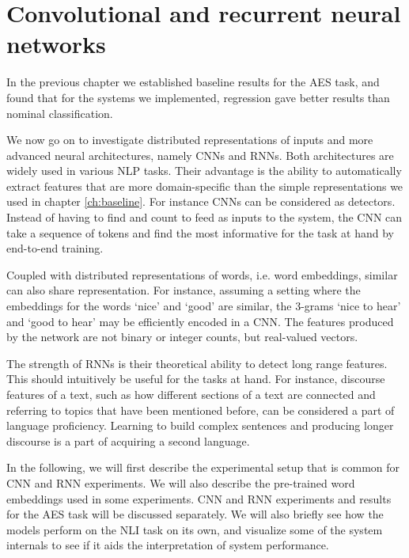 \chapter{Convolutional and recurrent neural networks}
\label{ch:sequencemodels}

In the previous chapter we established baseline results for the \ac{AES} task,
and found that for the systems we implemented, regression gave better results
than nominal classification.

We now go on to investigate distributed representations of inputs and more
advanced neural architectures, namely \acp{CNN} and \acp{RNN}. Both
architectures are widely used in various \ac{NLP} tasks. Their advantage is
the ability to automatically extract features that are more domain-specific
than the simple representations we used in chapter \ref{ch:baseline}. For
instance \acp{CNN} can be considered as \ngram detectors. Instead of having
to find and count \ngrams to feed as inputs to the system, the \ac{CNN} can
take a sequence of tokens and find the most informative \ngrams for the task
at hand by end-to-end training\autocite[155]{goldbergNLP}.

Coupled with distributed representations of words, i.e. word embeddings,
similar \ngrams can also share representation. For instance, assuming a
setting where the embeddings for the words `nice' and `good' are similar, the
3-grams `nice to hear' and `good to hear' may be efficiently encoded in a
\ac{CNN}. The features produced by the network are not binary or integer
counts, but real-valued vectors.

The strength of \acp{RNN} is their theoretical ability to detect long range
features. This should intuitively be useful for the tasks at hand. For
instance, discourse features of a text, such as how different sections of a
text are connected and referring to topics that have been mentioned before,
can be considered a part of language proficiency. Learning to build complex
sentences and producing longer discourse is a part of acquiring a second
language.

In the following, we will first describe the experimental setup that is
common for CNN and RNN experiments. We will also describe the pre-trained
word embeddings used in some experiments. CNN and RNN experiments and results
for the \ac{AES} task will be discussed separately. We will also briefly see
how the models perform on the \ac{NLI} task on its own, and visualize some of
the system internals to see if it aids the interpretation of system
performance.


